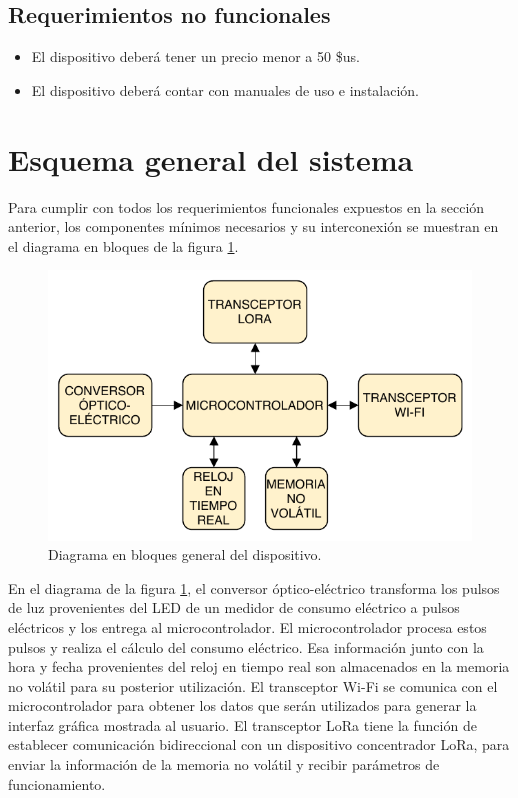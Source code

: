 \subsection{Requerimientos no funcionales}

\begin{itemize}
	\item El dispositivo deberá tener un precio menor a 50 \$us.
	\item El dispositivo deberá contar con manuales de uso e instalación.
\end{itemize}


\section{Esquema general del sistema}

Para cumplir con todos los requerimientos funcionales expuestos en la sección anterior, los componentes mínimos necesarios y su interconexión se muestran en el diagrama en bloques de la figura \ref{fig:diagramBlocks}.

\begin{figure}[h]
	\centering
	\includegraphics[scale=1]{./Figures/general_blocks.pdf}
	\caption{Diagrama en bloques general del dispositivo.}
	\label{fig:diagramBlocks}
\end{figure}

En el diagrama de la figura \ref{fig:diagramBlocks}, el conversor óptico-eléctrico transforma los pulsos de luz provenientes del LED de un  medidor de consumo eléctrico a pulsos eléctricos y los entrega al microcontrolador. El microcontrolador procesa estos pulsos y realiza el cálculo del consumo eléctrico. Esa información junto con la hora y fecha provenientes del reloj en tiempo real son almacenados en la memoria no volátil para su posterior utilización. El transceptor Wi-Fi se comunica con el microcontrolador para obtener los datos que serán utilizados para generar la interfaz gráfica mostrada al usuario. El transceptor LoRa tiene la función de establecer comunicación bidireccional con un dispositivo concentrador LoRa, para enviar la información de la memoria no volátil y recibir parámetros de funcionamiento.

